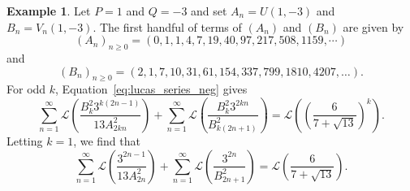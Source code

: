 \documentclass[10pt]{article}
\theoremstyle{definition}
\newtheorem{example}{Example}
\begin{document}
\begin{example}\label{ex:1,-3}
    Let $P=1$ and $Q = -3$ and set $A_n = U(1,-3)$ and ${B_n = V_n(1,-3)}$.  The first handful of terms of $(A_n)$ and $ (B_n)$ are given by
    \begin{equation}
        (A_n)_{n\geq 0} = (0,1,1,4,7,19,40,97,217,508,1159,\cdots)
    \end{equation}
    and 
    \begin{equation}
        (B_n)_{n\geq 0} = (2,1,7,10,31,61,154,337,799,1810,4207,\dots).
    \end{equation} 
    For odd $k$, Equation~\eqref{eq:lucas_series_neg} gives
    \begin{equation*}
        \sum_{n=1}^{\infty}\mathcal{L}\left(\frac{B^2_k 3^{k(2n-1)} }{13 A^2_{2kn} }\right) + \sum_{n=1}^{\infty}\mathcal{L}\left(\frac{B^2_k 3^{2kn}}{ B^2_{k(2n+1)} }\right) = \mathcal{L}\left(\left(\frac{6}{7+\sqrt{13}}\right)^k\right).
    \end{equation*}
    Letting $k=1$, we find that
    \begin{equation*}
        \sum_{n=1}^{\infty}\mathcal{L}\left(\frac{3^{2n-1} }{13 A^2_{2n} }\right) + \sum_{n=1}^{\infty}\mathcal{L}\left(\frac{3^{2n}}{ B^2_{2n+1} }\right) = \mathcal{L}\left(\frac{6}{7+\sqrt{13}}\right).
    \end{equation*}
\end{example}
\end{document}
